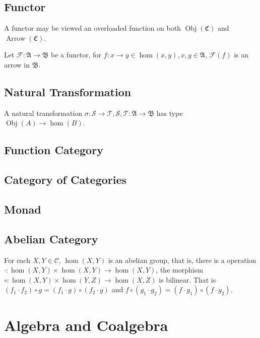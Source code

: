 \documentclass{article}
\newcommand{\obj}{\mathop{\mathrm{Obj}}}
\newcommand{\arrow}{\mathop{\mathrm{Arrow}}}
\begin{document}
\subsection{Functor}
A functor may be viewed an overloaded function on both $\obj(\mathfrak C)$ and
$\arrow(\mathfrak C)$.

Let $\mathcal F : \mathfrak A \to \mathfrak B$ be a functor,
for $f : x \to y \in \hom(x, y), x, y \in \mathfrak A$,
$\mathcal F(f)$ is an arrow in $\mathfrak B$.


\subsection{Natural Transformation}
A natural transformation
$\sigma : \mathcal S \to \mathcal T,
\mathcal S, \mathcal T : \mathfrak A \to \mathfrak B$ has type
$\obj(A) \to \hom(B)$.


\subsection{Function Category}

\subsection{Category of Categories}

\subsection{Monad}

\subsection{Abelian Category}
For each $X, Y \in \mathcal{C}$, $\hom(X, Y)$ is an abelian group,
that is, there is a operation $\cdot : \hom(X, Y) \times \hom(X, Y) \to \hom(X, Y)$,
the morphism $\circ : \hom(X, Y) \times \hom(Y, Z) \to \hom(X, Z)$ is bilinear.
That is $(f_1 \cdot f_2) \circ g = (f_1 \cdot g) \circ (f_2 \cdot g)$
and $f \circ (g_1 \cdot g_2) = (f \cdot g_1) \circ (f \cdot g_2)$.


\section{Algebra and Coalgebra}
\end{document}
